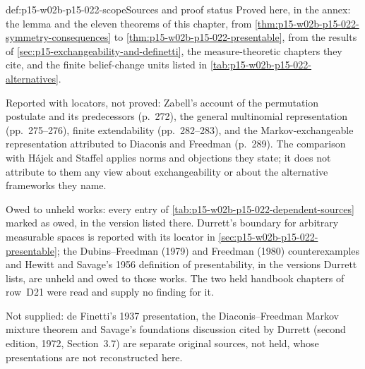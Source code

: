 \begin{proofboundary}{def:p15-w02b-p15-022-scope}{Sources and proof status}
Proved here, in the annex: the lemma and the eleven theorems of this
chapter, from \cref{thm:p15-w02b-p15-022-symmetry-consequences} to
\cref{thm:p15-w02b-p15-022-presentable}, from the results of
\cref{sec:p15-exchangeability-and-definetti}, the measure-theoretic
chapters they cite, and the finite belief-change units listed in
\cref{tab:p15-w02b-p15-022-alternatives}.

Reported with locators, not proved: Zabell's account of the permutation
postulate and its predecessors (p.~272), the general multinomial
representation (pp.~275--276), finite extendability (pp.~282--283), and
the Markov-exchangeable representation attributed to Diaconis and Freedman
(p.~289). The comparison with H\'ajek and Staffel applies norms and
objections they state; it does not attribute to them any view about
exchangeability or about the alternative frameworks they name.

Owed to unheld works: every entry of
\cref{tab:p15-w02b-p15-022-dependent-sources} marked as owed, in the
version listed there. Durrett's boundary for arbitrary measurable spaces
is reported with its locator in \cref{sec:p15-w02b-p15-022-presentable};
the Dubins--Freedman (1979) and Freedman (1980) counterexamples and Hewitt
and Savage's 1956 definition of presentability, in the versions Durrett
lists, are unheld and owed to those works. The two held handbook chapters
of row~D21 were read and supply no finding for it.

Not supplied: de Finetti's 1937 presentation, the Diaconis--Freedman Markov
mixture theorem and Savage's foundations discussion cited by Durrett
(second edition, 1972, Section~3.7) are separate original sources, not
held, whose presentations are not reconstructed here.
\end{proofboundary}

